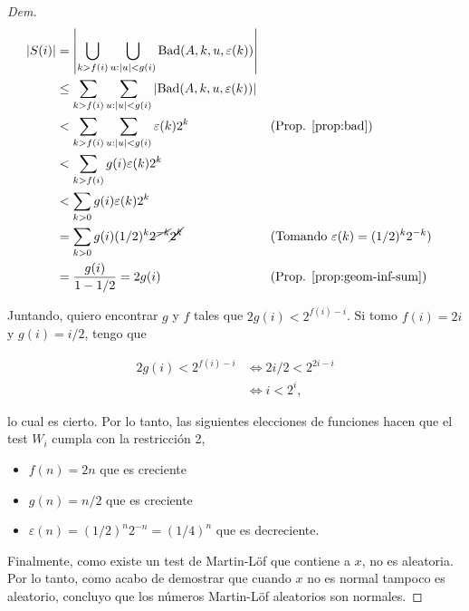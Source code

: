 \documentclass{article}
\theoremstyle{definition} %
\newcommand{\size}[1]{\left|#1\right|}
\newcommand{\ML}{Martin-Löf }
\newcommand{\Bad}[4]{\text{Bad}(#1, #2, #3, #4)}
\begin{document}
\begin{proof}[Dem]
    \begin{align*}
        \size{S(i)}
            &= \size{
                \bigcup_{k > f(i)} 
                \bigcup_{u : |u| < g(i)}
                \Bad{A}{k}{u}{\varepsilon(k)}
            }\\
            &\leq 
                \sum_{k > f(i)} 
                \sum_{u : |u| < g(i)}
                \size{\Bad{A}{k}{u}{\varepsilon(k)}}\\
            &<
                \sum_{k > f(i)} 
                \sum_{u : |u| < g(i)}
                    \varepsilon(k) 2^k
            &&(\text{Prop. \ref{prop:bad}})\\
            &<
                \sum_{k > f(i)} 
                    g(i)
                    \varepsilon(k) 2^k\\
            &< \sum_{k > 0} 
                    g(i)
                    \varepsilon(k) 2^k\\
            &= \sum_{k > 0} 
                g(i)
                (1/2)^k \cancel{2^{-k}} \cancel{2^k}
            &&(\text{Tomando } \varepsilon(k) = (1/2)^k 2^{-k})\\
            &= \frac
                {g(i)}
                {1 - 1/2}
            = 2g(i)
            &&\text{(Prop. \ref{prop:geom-inf-sum})}
    \end{align*}

    Juntando, quiero encontrar $g$ y $f$ tales que $2g(i) < 2^{f(i)- i}$.
    Si tomo $f(i) = 2i$ y $g(i) = i/2$, tengo que

    \begin{align*}
        2g(i) < 2^{f(i)- i}
            &\iff 2 i/2 < 2^{2i - i} \\
            &\iff i < 2^{i},
    \end{align*}

    lo cual es cierto. Por lo tanto, las siguientes elecciones de funciones
    hacen que el test $W_i$ cumpla con la restricción 2,
    
    \begin{itemize}
        \item $f(n) = 2n$ que es creciente
        \item $g(n) = n/2$ que es creciente
        \item $\varepsilon(n) = (1/2)^n 2^{-n} = (1/4)^n$ que es decreciente.
    \end{itemize}

    Finalmente, como existe un test de \ML que contiene a $x$, no es aleatoria.
    Por lo tanto, como acabo de demostrar que cuando $x$ no es normal tampoco es
    aleatorio, concluyo que los números \ML aleatorios son normales.
\end{proof}
\end{document}
